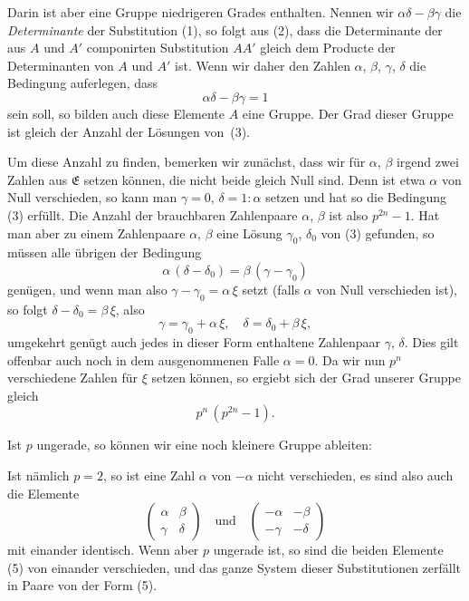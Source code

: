 \documentclass[12pt,a4paper]{article}
\begin{document}
Darin ist aber eine Gruppe niedrigeren Grades enthalten. Nennen wir $\alpha\delta - \beta\gamma$ die \emph{Determinante} der Substitution (1), so folgt aus (2), dass die Determinante der aus $A$ und $A'$ componirten Substitution $AA'$ gleich dem Producte der Determinanten von $A$ und $A'$ ist. Wenn wir daher den Zahlen $\alpha$, $\beta$, $\gamma$, $\delta$ die Bedingung auferlegen, dass
\begin{equation}\label{eq:65.3}
\tag{3}
\alpha\delta - \beta\gamma = 1
\end{equation}
sein soll, so bilden auch diese Elemente $A$ eine Gruppe. Der Grad dieser Gruppe ist gleich der Anzahl der Lösungen von~(3).

Um diese Anzahl zu finden, bemerken wir zunächst, dass wir für $\alpha$, $\beta$ irgend zwei Zahlen aus $\mathfrak{E}$ setzen können, die nicht beide gleich Null sind. Denn ist etwa $\alpha$ von Null verschieden, so kann man $\gamma = 0$, $\delta = 1 : \alpha$ setzen und hat so die Bedingung (3) erfüllt. Die Anzahl der brauchbaren Zahlenpaare $\alpha$, $\beta$ ist also $p^{2n} - 1$. Hat man aber zu einem Zahlenpaare $\alpha$, $\beta$ eine Lösung $\gamma_{0}$, $\delta_{0}$ von (3) gefunden, so müssen alle übrigen der Bedingung
\[
\alpha\,(\delta - \delta_{0}) = \beta\,(\gamma - \gamma_{0})
\]
genügen, und wenn man also $\gamma - \gamma_{0} = \alpha\,\xi$ setzt (falls $\alpha$ von Null verschieden ist), so folgt $\delta - \delta_{0} = \beta\,\xi$, also
\[
\gamma = \gamma_{0} + \alpha\,\xi,\quad \delta = \delta_{0} + \beta\,\xi,
\]
umgekehrt genügt auch jedes in dieser Form enthaltene Zahlenpaar $\gamma$, $\delta$. Dies gilt offenbar auch noch in dem ausgenommenen Falle $\alpha = 0$. Da wir nun $p^{n}$ verschiedene Zahlen für $\xi$ setzen können, so ergiebt sich der Grad unserer Gruppe gleich
\begin{equation}\label{eq:65.4}
\tag{4}
p^{n}\,(p^{2n} - 1).
\end{equation}

Ist $p$ ungerade, so können wir eine noch kleinere Gruppe ableiten:

Ist nämlich $p = 2$, so ist eine Zahl $\alpha$ von $-\alpha$ nicht verschieden, es sind also auch die Elemente
\begin{equation}\label{eq:65.5}
\tag{5}
\begin{pmatrix}\alpha&\beta\\\gamma&\delta\end{pmatrix}
\quad\text{und}\quad
\begin{pmatrix}-\alpha&-\beta\\-\gamma&-\delta\end{pmatrix}
\end{equation}
mit einander identisch. Wenn aber $p$ ungerade ist, so sind die beiden Elemente (5) von einander verschieden, und das ganze System dieser Substitutionen zerfällt in Paare von der Form (5).
\end{document}
